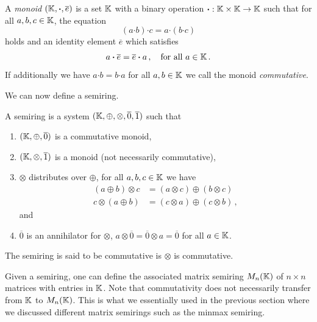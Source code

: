 \begin{definition*}
  A \emph{monoid} $(\mathbb{K}, \boldsymbol{\cdot}, \overline{e})$ is a set $\mathbb{K}$ with a
  binary operation $\boldsymbol{\cdot} : \mathbb{K} \times \mathbb{K} \rightarrow \mathbb{K}$ such that
  for all $a,b,c \in \mathbb{K}$, the equation
  \begin{equation*}
    (a \boldsymbol{\cdot} b) \boldsymbol{\cdot} c = a \boldsymbol{\cdot} (b \boldsymbol{\cdot} c)
  \end{equation*}
  holds and an identity element $\overline{e}$ which satisfies
  \begin{equation*}
    a \boldsymbol{\cdot} \overline{e} = \overline{e} \boldsymbol{\cdot} a\,, \quad \text{for all } a \in \mathbb{K}\,.
  \end{equation*}
  If additionally we have $a\boldsymbol{\cdot}b = b \boldsymbol{\cdot} a$ for
  all $a,b \in \mathbb{K}$ we call the monoid \emph{commutative}.
\end{definition*}
We can now define a semiring.
\begin{definition*}
  A semiring is a system $(\mathbb{K},\oplus,\otimes,\overline{0},\overline{1})$ such
  that
  \begin{enumerate}
  \item $(\mathbb{K}, \oplus, \overline{0})$ is a commutative monoid,
  \item $(\mathbb{K}, \otimes, \overline{1})$ is a monoid (not necessarily commutative),
  \item $\otimes$ distributes over $\oplus$, \ie for all $a,b,c \in \mathbb{K}$ we have
    \begin{align*}
      (a \oplus b) \otimes c &= (a \otimes c) \oplus (b \otimes c) \\
      c \otimes (a \oplus b) &= (c \otimes a) \oplus (c \otimes b)\,,
    \end{align*}
    and
  \item $\overline{0}$ is an annihilator for $\otimes$, \ie
    $a \otimes \overline{0} = \overline{0} \otimes a = \overline{0}$ for all
    $a \in \mathbb{K}$.
  \end{enumerate}
  The semiring is said to be commutative is $\otimes$ is commutative.
\end{definition*}
Given a semiring, one can define the associated matrix semiring $M_n(\mathbb{K})$ of
$n \times n$ matrices with entries in $\mathbb{K}$. Note that commutativity does not
necessarily transfer from $\mathbb{K}$ to $M_n(\mathbb{K})$.  This is what we essentially used
in the previous section where we discussed different matrix semirings such as
the minmax semiring.

